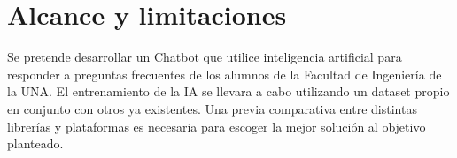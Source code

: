 \section{Alcance y limitaciones}
Se pretende desarrollar un Chatbot que utilice inteligencia artificial para responder a preguntas
frecuentes de los alumnos de la Facultad de Ingeniería de la UNA. El entrenamiento de la IA se
llevara a cabo utilizando un dataset propio en conjunto con otros ya existentes.
Una previa comparativa entre distintas librerías y plataformas es necesaria para escoger la mejor
solución al objetivo planteado.
